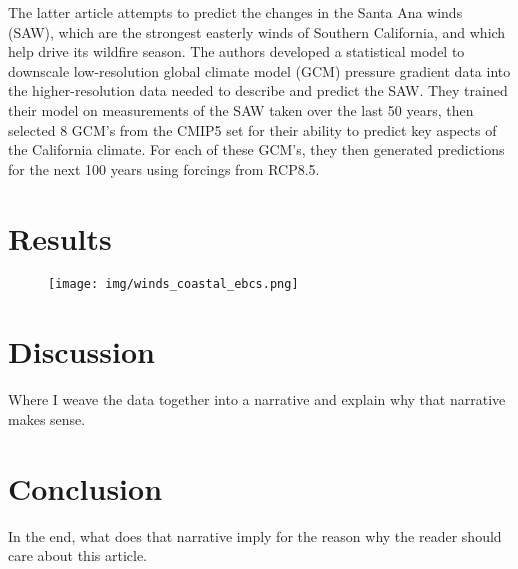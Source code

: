 \documentclass[12pt, letterpaper]{article}
\begin{document}
	The latter article \citep{winds-santa-ana} attempts to predict the changes in the Santa Ana winds (SAW), which are the strongest easterly winds of Southern California, and which help drive its wildfire season. The authors developed a statistical model to downscale low-resolution global climate model (GCM) pressure gradient data into the higher-resolution data needed to describe and predict the SAW. They trained their model on measurements of the SAW taken over the last 50 years, then selected 8 GCM's from the CMIP5 set for their ability to predict key aspects of the California climate. For each of these GCM's, they then generated predictions for the next 100 years using forcings from RCP8.5. \citep{winds-santa-ana}

	\section{Results}
	
	
	\begin{figure}[h]
		\centering
		\texttt{[image: img/winds\_coastal\_ebcs.png]}
		\caption{\citep{winds-coastal}}
	\end{figure}


	\section {Discussion}
	Where I weave the data together into a narrative and explain why that narrative makes sense.

	\section {Conclusion}
	In the end, what does that narrative imply for the reason why the reader should care about this article.

	
	
\end{document}
